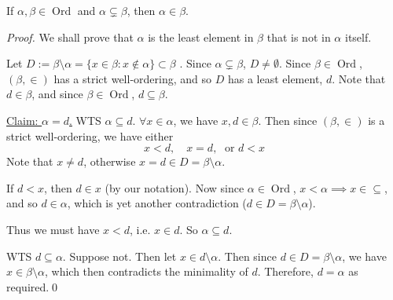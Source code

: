 \documentclass[notoc,notitlepage]{tufte-book}
\DeclareMathOperator{\Ord}{Ord }
\begin{document}
\begin{lemma}
\label{lemma:proper_subsets_of_an_ordinal_are_its_elements}
  If $\alpha, \beta \in \Ord$ and $\alpha \subsetneq \beta$, then $\alpha \in \beta$.
\end{lemma}

\begin{proof}
  We shall prove that $\alpha$ is the least element in $\beta$ that is not in $\alpha$ itself.

  Let $D := \beta \setminus \alpha = \{ x \in \beta : x \notin \alpha \} \subset \beta$ . Since $\alpha \subsetneq \beta$, $D \neq \emptyset$. Since $\beta \in \Ord$, $(\beta, \in)$ has a strict well-ordering, and so $D$ has a least element, $d$. Note that $d \in \beta$, and since $\beta \in \Ord$, $d \subseteq \beta$.

  \noindent\underline{Claim: $\alpha = d$.} WTS $\alpha \subseteq d$. $\forall x \in \alpha$, we have $x, d \in \beta$. Then since $(\beta, \in)$ is a strict well-ordering, we have either
  \begin{equation*}
    x < d, \quad x = d, \; \text{ or } d < x
  \end{equation*}
  Note that $x \neq d$, otherwise $x = d \in D = \beta \setminus \alpha$.

   If $d < x$, then $d \in x$ (by our notation). Now since $\alpha \in \Ord$, $x < \alpha \implies x \in \subseteq$, and so $d \in \alpha$, which is yet another contradiction ($d \in D = \beta \setminus \alpha$).

    Thus we must have $x < d$, i.e. $x \in d$. So $\alpha \subseteq d$.

    WTS $d \subseteq \alpha$. Suppose not. Then let $x \in d \setminus \alpha$. Then since $d \in D = \beta \setminus \alpha$, we have $x \in \beta \setminus \alpha$, which then contradicts the minimality of $d$. Therefore, $d = \alpha$ as required.\qed
\end{proof}
\end{document}
